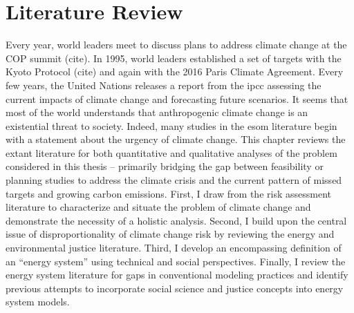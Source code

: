 \chapter{Literature Review}
Every year, world leaders meet to discuss plans to address climate change at the
COP summit (cite). In 1995, world leaders established a set of targets with the
Kyoto Protocol (cite) and again with the 2016 Paris Climate Agreement. Every few
years, the United Nations releases a report from the \ac{ipcc} assessing the
current impacts of climate change and forecasting future scenarios. It seems
that most of the world understands that anthropogenic climate change is an
existential threat to society. Indeed, many studies in the \ac{esom} literature
begin with a statement about the urgency of climate change. This chapter reviews
the extant literature for both quantitative and qualitative analyses of the
problem considered in this thesis -- primarily bridging the gap between
feasibility or planning studies to address the climate crisis and the current
pattern of missed targets and growing carbon emissions. First, I draw from the
risk assessment literature to characterize and situate the problem of climate
change and demonstrate the necessity of a holistic analysis. Second, I build
upon the central issue of disproportionality of climate change risk by reviewing
the energy and environmental justice literature. Third, I develop an
encompassing definition of an ``energy system'' using technical and social
perspectives. Finally, I review the energy system literature for gaps in
conventional modeling practices and identify previous attempts to incorporate
social science and justice concepts into energy system models.





